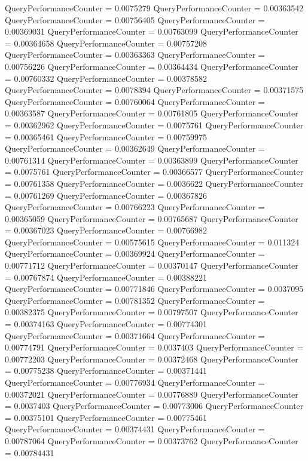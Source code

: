 \documentclass[9pt]{article}
\theoremstyle{plain}
\theoremstyle{definition}
\theoremstyle{remark}
\numberwithin{equation}{section}
\begin{document}
QueryPerformanceCounter  =  0.0075279
QueryPerformanceCounter  =  0.00363542
QueryPerformanceCounter  =  0.00756405
QueryPerformanceCounter  =  0.00369031
QueryPerformanceCounter  =  0.00763099
QueryPerformanceCounter  =  0.00364658
QueryPerformanceCounter  =  0.00757208
QueryPerformanceCounter  =  0.00363363
QueryPerformanceCounter  =  0.00756226
QueryPerformanceCounter  =  0.00364434
QueryPerformanceCounter  =  0.00760332
QueryPerformanceCounter  =  0.00378582
QueryPerformanceCounter  =  0.0078394
QueryPerformanceCounter  =  0.00371575
QueryPerformanceCounter  =  0.00760064
QueryPerformanceCounter  =  0.00363587
QueryPerformanceCounter  =  0.00761805
QueryPerformanceCounter  =  0.00362962
QueryPerformanceCounter  =  0.0075761
QueryPerformanceCounter  =  0.00365461
QueryPerformanceCounter  =  0.00759975
QueryPerformanceCounter  =  0.00362649
QueryPerformanceCounter  =  0.00761314
QueryPerformanceCounter  =  0.00363899
QueryPerformanceCounter  =  0.0075761
QueryPerformanceCounter  =  0.00366577
QueryPerformanceCounter  =  0.00761358
QueryPerformanceCounter  =  0.0036622
QueryPerformanceCounter  =  0.00761269
QueryPerformanceCounter  =  0.00367826
QueryPerformanceCounter  =  0.00766223
QueryPerformanceCounter  =  0.00365059
QueryPerformanceCounter  =  0.00765687
QueryPerformanceCounter  =  0.00367023
QueryPerformanceCounter  =  0.00766982
QueryPerformanceCounter  =  0.00575615
QueryPerformanceCounter  =  0.011324
QueryPerformanceCounter  =  0.00369924
QueryPerformanceCounter  =  0.00771712
QueryPerformanceCounter  =  0.00370147
QueryPerformanceCounter  =  0.00767874
QueryPerformanceCounter  =  0.00388221
QueryPerformanceCounter  =  0.00771846
QueryPerformanceCounter  =  0.0037095
QueryPerformanceCounter  =  0.00781352
QueryPerformanceCounter  =  0.00382375
QueryPerformanceCounter  =  0.00797507
QueryPerformanceCounter  =  0.00374163
QueryPerformanceCounter  =  0.00774301
QueryPerformanceCounter  =  0.00371664
QueryPerformanceCounter  =  0.00774791
QueryPerformanceCounter  =  0.0037403
QueryPerformanceCounter  =  0.00772203
QueryPerformanceCounter  =  0.00372468
QueryPerformanceCounter  =  0.00775238
QueryPerformanceCounter  =  0.00371441
QueryPerformanceCounter  =  0.00776934
QueryPerformanceCounter  =  0.00372021
QueryPerformanceCounter  =  0.00776889
QueryPerformanceCounter  =  0.0037403
QueryPerformanceCounter  =  0.00773006
QueryPerformanceCounter  =  0.00375101
QueryPerformanceCounter  =  0.00775461
QueryPerformanceCounter  =  0.00374431
QueryPerformanceCounter  =  0.00787064
QueryPerformanceCounter  =  0.00373762
QueryPerformanceCounter  =  0.00784431
\end{document}
